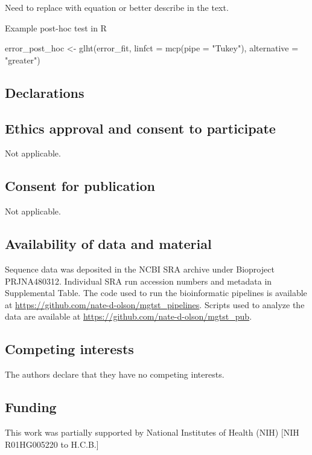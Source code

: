 \documentclass{bmcart}
\begin{document}
Need to replace with equation or better describe in the text.
\begin{verbatim*}
Example post-hoc test in R

error_post_hoc <- glht(error_fit, linfct = mcp(pipe = "Tukey"), alternative = "greater")
\end{verbatim*}




\begin{backmatter}

\section*{Declarations}

\subsection*{Ethics approval and consent to participate}
Not applicable.

\subsection*{Consent for publication}
Not applicable.

\subsection*{Availability of data and material}
Sequence data was deposited in the NCBI SRA archive under Bioproject
PRJNA480312.
Individual SRA run accession numbers and metadata in Supplemental Table.
The code used to run the bioinformatic pipelines is available at
\url{https://github.com/nate-d-olson/mgtst_pipelines}.
Scripts used to analyze the data are available at
\url{https://github.com/nate-d-olson/mgtst_pub}.

\subsection*{Competing interests}
The authors declare that they have no competing interests.

\subsection*{Funding}
This work was partially supported by National Institutes of Health (NIH)
{[}NIH R01HG005220 to H.C.B.{]}


\end{backmatter}
\end{document}
